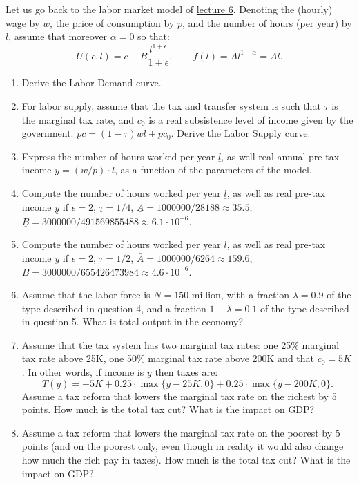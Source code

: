 \documentclass[]{book}
\theoremstyle{definition}
\theoremstyle{definition}
\theoremstyle{definition}
\theoremstyle{remark}
\begin{document}
Let us go back to the labor market model of
\protect\hyperlink{labor-market}{lecture 6}. Denoting the (hourly) wage
by \(w\), the price of consumption by \(p\), and the number of hours
(per year) by \(l\), assume that moreover \(\alpha=0\) so that:
\[U(c, l)=c-B\frac{l^{1+\epsilon}}{1+\epsilon}, \qquad f(l)=Al^{1-\alpha} = A l.\]

\begin{enumerate}
\def\labelenumi{\arabic{enumi}.}
\item
  Derive the Labor Demand curve.
\item
  For labor supply, assume that the tax and transfer system is such that
  \(\tau\) is the marginal tax rate, and \(c_0\) is a real subsistence
  level of income given by the government: \(pc = (1-\tau)wl + p c_0\).
  Derive the Labor Supply curve.
\item
  Express the number of hours worked per year \(\underline{l}\), as well
  real annual pre-tax income \(y=(w/p) \cdot l\), as a function of the
  parameters of the model.
\item
  Compute the number of hours worked per year \(\underline{l}\), as well
  as real pre-tax income \(\underline{y}\) if \(\epsilon = 2\),
  \(\underline{\tau}=1/4\),
  \(\underline{A}= 1000000/28188\approx 35.5\),
  \(\underline{B}= 3000000/491569855488 \approx 6.1 \cdot 10^{-6}\).
\item
  Compute the number of hours worked per year \(\bar{l}\), as well as
  real pre-tax income \(\bar{y}\) if \(\epsilon = 2\),
  \(\bar{\tau}=1/2\), \(\bar{A}= 1000000/6264\approx 159.6\),
  \(\bar{B}=3000000/655426473984 \approx 4.6 \cdot 10^{-6}\).
\item
  Assume that the labor force is \(N = 150\) million, with a fraction
  \(\lambda = 0.9\) of the type described in question 4, and a fraction
  \(1-\lambda = 0.1\) of the type described in question 5. What is total
  output in the economy?
\item
  Assume that the tax system has two marginal tax rates: one 25\%
  marginal tax rate above 25K, one 50\% marginal tax rate above 200K and
  that \(c_0=5K\). In other words, if income is \(y\) then taxes are:
  \[T(y) = -5K + 0.25\cdot \max \{ y-25K, 0 \} + 0.25\cdot \max \{ y-200K, 0 \}.\]
  Assume a tax reform that lowers the marginal tax rate on the richest
  by 5 points. How much is the total tax cut? What is the impact on GDP?
\item
  Assume a tax reform that lowers the marginal tax rate on the poorest
  by 5 points (and on the poorest only, even though in reality it would
  also change how much the rich pay in taxes). How much is the total tax
  cut? What is the impact on GDP?
\end{enumerate}
\end{document}
